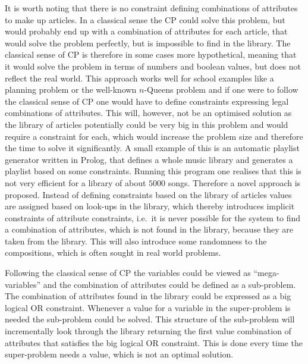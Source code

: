 It is worth noting that there is no constraint defining combinations of attributes to make up articles. In a classical sense the CP could solve this problem, but would probably end up with a combination of attributes for each article, that would solve the problem perfectly, but is impossible to find in the library. The classical sense of CP is therefore in some cases more hypothetical, meaning that it would solve the problem in terms of numbers and boolean values, but does not reflect the real world. This approach works well for school examples like a planning problem or the well-known $n$-Queens problem and if one were to follow the classical sense of CP one would have to define constraints expressing legal combinations of attributes. This will, however, not be an optimised solution as the library of articles potentially could be very big in this problem and would require a constraint for each, which would increase the problem size and therefore the time to solve it significantly. A small example of this is an automatic playlist generator written in Prolog, that defines a whole music library and generates a playlist based on some constraints. Running this program one realises that this is not very efficient for a library of about $5000$ songs. Therefore a novel approach is proposed. Instead of defining constraints based on the library of articles values are assigned based on look-ups in the library, which thereby introduces implicit constraints of attribute constraints, i.e.\ it is never possible for the system to find a combination of attributes, which is not found in the library, because they are taken from the library. This will also introduce some randomness to the compositions, which is often sought in real world problems.

Following the classical sense of CP the variables could be viewed as ``mega-variables'' and the combination of attributes could be defined as a sub-problem. The combination of attributes found in the library could be expressed as a big logical OR constraint. Whenever a value for a variable in the super-problem is needed the sub-problem could be solved. This structure of the sub-problem will incrementally look through the library returning the first value combination of attributes that satisfies the big logical OR constraint. This is done every time the super-problem needs a value, which is not an optimal solution.

